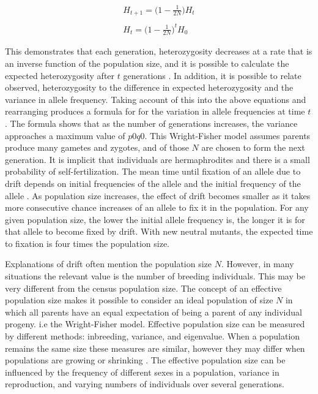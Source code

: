 \begin{subequations}
\begin{align}
H_{t+1} = \bigg(1-\frac{1}{2N}\bigg)H_t\\
\nonumber\\
H_{t} = \bigg(1-\frac{1}{2N}\bigg)^tH_0
\end{align}
\end{subequations}

This demonstrates that each generation, heterozygosity decreases at a rate that is an inverse function of the population size, and it is possible to calculate the expected heterozygosity after $t$ generations \parencite{Hedrick2010,Charlesworth2010}.
In addition, it is possible to relate observed, heterozygosity to the difference in expected heterozygosity and the variance in allele frequency. 
Taking account of this into the above equations and rearranging produces a formula for for the variation in allele frequencies at time $t$.
The formula shows that as the number of generations increases, the variance approaches a maximum value of $p0q0$.
This Wright-Fisher model assumes parents produce many gametes and zygotes, and of those $N$ are chosen to form the next generation. It is implicit that individuals are hermaphrodites and there is a small probability of self-fertilization.
The mean time until fixation of an allele due to drift depends on initial frequencies of the allele and the initial frequency of the allele \parencite{Hedrick2010,Charlesworth2010}.
As population size increases, the effect of drift becomes smaller as it takes more consecutive chance increases of an allele to fix it in the population.
For any given population size, the lower the initial allele frequency is, the longer it is for that allele to become fixed by drift.
With new neutral mutants, the expected time to fixation is four times the population size.

Explanations of drift often mention the population size $N$. However, in many situations the relevant value is the number of breeding individuals.
This may be very different from the census population size.
The concept of an effective population size makes it possible to consider an ideal population of size $N$ in which all parents have an equal expectation of being a parent of any individual progeny. i.e the Wright-Fisher model.
Effective population size can be measured by different methods: inbreeding, variance, and eigenvalue.
When a population remains the same size these measures are similar, however they may differ when populations are growing or shrinking \parencite{All2012,Waples2002}.
The effective population size can be influenced by the frequency of different sexes in a population, variance in reproduction, and varying numbers of individuals over several generations.

